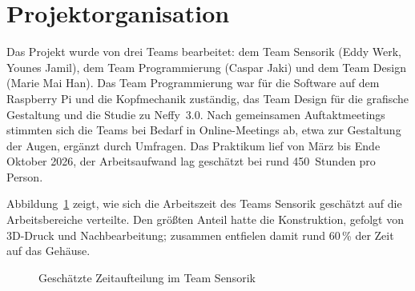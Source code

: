\section{Projektorganisation}
\label{sec:organisation}

Das Projekt wurde von drei Teams bearbeitet: dem Team Sensorik (Eddy Werk, Younes Jamil), dem
Team Programmierung (Caspar Jaki) und dem Team Design (Marie Mai Han). Das Team Programmierung
war für die Software auf dem Raspberry Pi und die Kopfmechanik zuständig, das Team Design für die
grafische Gestaltung und die Studie zu Neffy~3.0. Nach gemeinsamen
Auftaktmeetings stimmten sich die Teams bei Bedarf in Online-Meetings ab, etwa zur Gestaltung
der Augen, ergänzt durch Umfragen. Das Praktikum lief von März bis Ende Oktober 2026, der Arbeitsaufwand lag geschätzt bei rund
450~Stunden pro Person.

Abbildung~\ref{fig:zeitaufteilung} zeigt, wie sich die Arbeitszeit des Teams Sensorik
geschätzt auf die Arbeitsbereiche verteilte. Den größten Anteil hatte die Konstruktion,
gefolgt von 3D-Druck und Nachbearbeitung; zusammen entfielen damit rund 60\,\% der Zeit auf
das Gehäuse.

\begin{figure}[htbp]
  \centering
  \caption{Geschätzte Zeitaufteilung im Team Sensorik}
  \label{fig:zeitaufteilung}
\end{figure}

